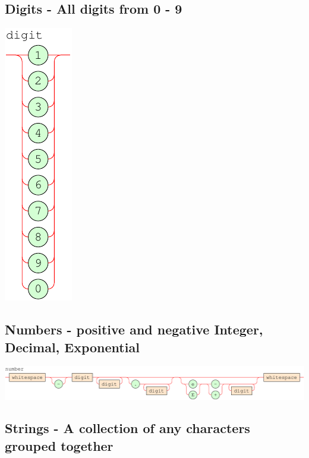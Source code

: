 \documentclass[a4paper]{article}
\begin{document}
\subsection*{Digits - All digits from 0 - 9}


{\centering

   \includegraphics[scale=0.9]{EBNF/digit}

}

\subsection*{Numbers - positive and negative Integer, Decimal, Exponential }


{\centering

   \includegraphics[scale=0.8]{EBNF/number}

}

\subsection*{Strings - A collection of any characters grouped together }
\end{document}
